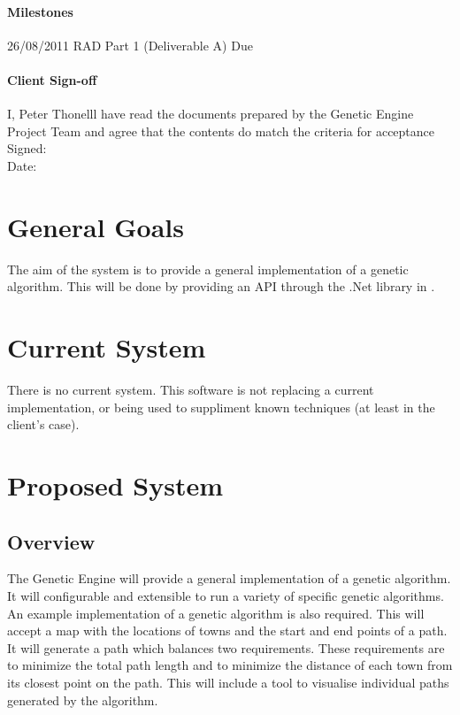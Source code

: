 \paragraph*{Milestones}
26/08/2011 RAD Part 1 (Deliverable A) Due

\paragraph*{Client Sign-off}
I, Peter Thonelll have read the documents prepared by the Genetic Engine Project Team and agree that the contents do match the criteria for acceptance \\
Signed: \hfill \\
Date: \hfill \\

\clearpage


%
%
\section{General Goals}
The aim of the system is to provide a general implementation of a genetic algorithm. 
This will be done by providing an API through the .Net library in \csharp. 


%
%
\section{Current System}
There is no current system. %
This software is not replacing a current implementation, or being used to suppliment known techniques (at least in the client's case).


%
%

\section{Proposed System}
\subsection{Overview}
The Genetic Engine will provide a general implementation of a genetic algorithm. It will configurable and extensible to run a variety of specific genetic algorithms.
An example implementation of a genetic algorithm is also required. This will accept a map with the locations of towns and the start and end points of a path. It will generate a path which balances two requirements. These requirements are to minimize the total path length and to minimize the distance of each town from its closest point on the path. This will include a tool to visualise individual paths generated by the algorithm.

